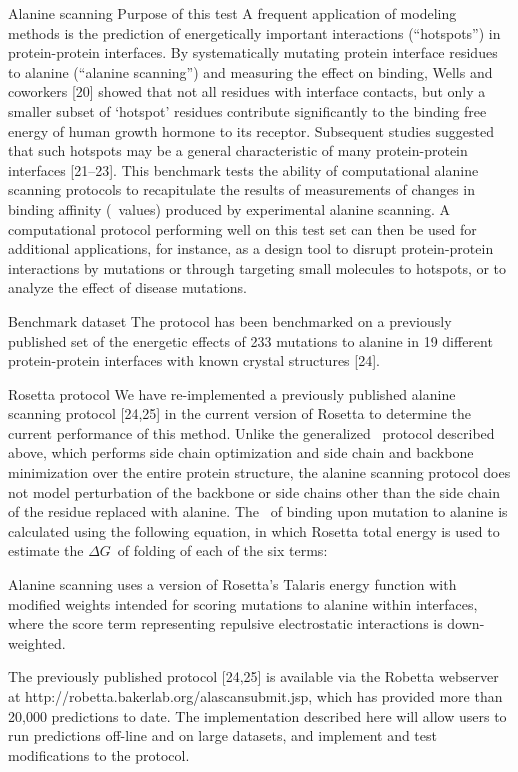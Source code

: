 Alanine scanning
Purpose of this test
A frequent application of modeling methods is the prediction of energetically important interactions (“hotspots”) in protein-protein interfaces. By systematically mutating protein interface residues to alanine (“alanine scanning”) and measuring the effect on binding, Wells and coworkers [20] showed that not all residues with interface contacts, but only a smaller subset of ‘hotspot’ residues contribute significantly to the binding free energy of human growth hormone to its receptor. Subsequent studies suggested that such hotspots may be a general characteristic of many protein-protein interfaces [21–23]. This benchmark tests the ability of computational alanine scanning protocols to recapitulate the results of measurements of changes in binding affinity (\ddg\ values) produced by experimental alanine scanning. A computational protocol performing well on this test set can then be used for additional applications, for instance, as a design tool to disrupt protein-protein interactions by mutations or through targeting small molecules to hotspots, or to analyze the effect of disease mutations.

Benchmark dataset
The protocol has been benchmarked on a previously published set of the energetic effects of 233 mutations to alanine in 19 different protein-protein interfaces with known crystal structures [24].

Rosetta protocol
We have re-implemented a previously published alanine scanning protocol [24,25] in the current version of Rosetta to determine the current performance of this method. Unlike the generalized \ddg\ protocol described above, which performs side chain optimization and side chain and backbone minimization over the entire protein structure, the alanine scanning protocol does not model perturbation of the backbone or side chains other than the side chain of the residue replaced with alanine.
The \ddg\ of binding upon mutation to alanine is calculated using the following equation, in which Rosetta total energy is used to estimate the $\Delta G$\ of folding of each of the six terms:



Alanine scanning uses a version of Rosetta’s Talaris energy function with modified weights intended for scoring mutations to alanine within interfaces, where the score term representing repulsive electrostatic interactions is down-weighted.

The previously published protocol [24,25] is available via the Robetta webserver at http://robetta.bakerlab.org/alascansubmit.jsp, which has provided more than 20,000 predictions to date. The implementation described here will allow users to run predictions off-line and on large datasets, and implement and test modifications to the protocol.

